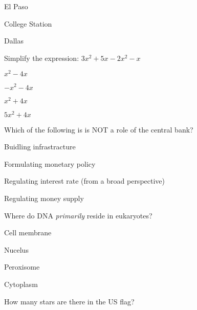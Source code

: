 \documentclass[12pt]{exam}
\begin{document}
\begin{questions}
\begin{oneparchoices}
            \choice El Paso
        
            \choice College Station
        
            \choice Dallas
        
        \end{oneparchoices}

    \question Simplify the expression: $3x^2 + 5x - 2x^2 - x$
    
        \begin{oneparchoices}
        
            \choice $x^2 - 4x$
        
            \choice $-x^2 - 4x$
        
            \choice $x^2 + 4x$
        
            \choice $5x^2 + 4x$
        
        \end{oneparchoices}

    \question Which of the following is is NOT a role of the central bank?
    
        \begin{oneparchoices}
        
            \choice Buidling infrastracture
        
            \choice Formulating monetary policy
        
            \choice Regulating interest rate (from a broad perspective)
        
            \choice Regulating money supply
        
        \end{oneparchoices}

    \question Where do DNA \textit{primarily} reside in eukaryotes?
    
        \begin{oneparchoices}
        
            \choice Cell membrane
        
            \choice Nucelus
        
            \choice Peroxisome
        
            \choice Cytoplasm
        
        \end{oneparchoices}

    \question How many stars are there in the US flag?
    
        \begin{oneparchoices}
        

\end{oneparchoices}
\end{questions}
\end{document}
